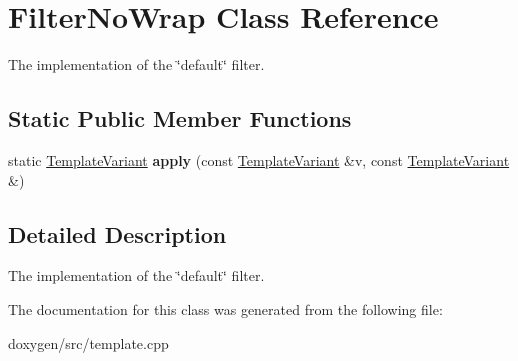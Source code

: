 \hypertarget{class_filter_no_wrap}{}\section{Filter\+No\+Wrap Class Reference}
\label{class_filter_no_wrap}


The implementation of the \char`\"{}default\char`\"{} filter.  


\subsection*{Static Public Member Functions}
\begin{DoxyCompactItemize}
\item 
\mbox{\label{class_filter_no_wrap_ae98cbd7f24f8646da10cc7f321e0c3ad}} 
static \mbox{\hyperlink{class_template_variant}{Template\+Variant}} {\bfseries apply} (const \mbox{\hyperlink{class_template_variant}{Template\+Variant}} \&v, const \mbox{\hyperlink{class_template_variant}{Template\+Variant}} \&)
\end{DoxyCompactItemize}


\subsection{Detailed Description}
The implementation of the \char`\"{}default\char`\"{} filter. 

The documentation for this class was generated from the following file\+:\begin{DoxyCompactItemize}
\item 
doxygen/src/template.\+cpp\end{DoxyCompactItemize}
